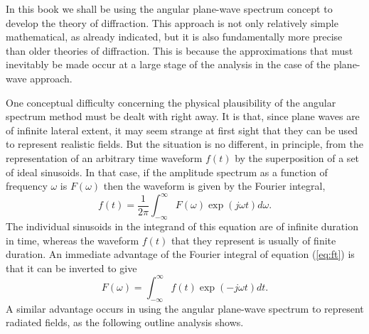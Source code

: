 In this book we shall be using the angular plane-wave spectrum concept to develop the theory of diffraction. This approach is not only relatively simple mathematical, as already indicated, but it is also fundamentally more precise than older theories of diffraction. This is because the approximations that must inevitably be made occur at a large stage of the analysis in the case of the plane-wave approach.

One conceptual difficulty concerning the physical plausibility of the angular spectrum method must be dealt with right away. It is that, since plane waves are of infinite lateral extent, it may seem strange at first sight that they can be used to represent realistic fields. But the situation is no different, in principle, from the representation of an arbitrary time waveform $f(t)$ by the superposition of a set of ideal sinusoids. In that case, if the amplitude spectrum as a function of frequency ${\omega}$ is $F({\omega})$ then the waveform is given by the Fourier integral, 
\begin{equation}
f(t)=\frac{1}{2\pi}\int_{-\infty}^{\infty}F(\omega)\exp(j\omega t)d\omega.
\label{eq:ft}
\end{equation}
The individual sinusoids in the integrand of this equation are of infinite duration in time, whereas the waveform $f(t)$ that they represent is usually of finite duration. An immediate advantage of the Fourier integral of equation (\ref{eq:ft}) is that it can be inverted to give
\begin{equation}
F(\omega)=\int_{-\infty}^{\infty}f(t)\exp(-j\omega t)dt.
\end{equation}
A similar advantage occurs in using the angular plane-wave spectrum to represent radiated fields, as the following outline analysis shows.

